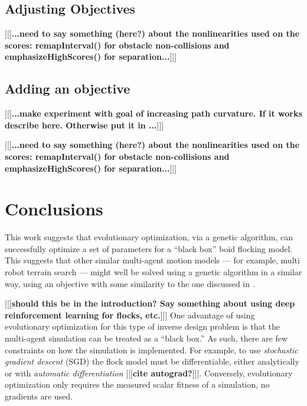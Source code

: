 \documentclass[letterpaper]{article}
\begin{document}
\subsection{Adjusting Objectives}
\label{subsec:adjust_objective}

[[[\textbf{...need to say something (here?) about the nonlinearities used on the scores: remapInterval() for obstacle non-collisions and emphasizeHighScores() for separation...}]]]

\subsection{Adding an objective}
\label{subsec:add_objective}

[[[\textbf{...make experiment with goal of increasing path curvature. If it works describe here. Otherwise put it in ...}]]]

[[[\textbf{...need to say something (here?) about the nonlinearities used on the scores: remapInterval() for obstacle non-collisions and emphasizeHighScores() for separation...}]]]

\section{Conclusions}
\label{sec:Conclusions}

This work suggests that evolutionary optimization, via a genetic algorithm, can successfully optimize a set of parameters for a ``black box'' boid flocking model. This suggests that other similar multi-agent motion models --- for example, multi robot terrain search --- might well be solved using a genetic algorithm in a similar way, using an objective with some similarity to the one discussed in .

[[[\textbf{should this be in the introduction? Say something about using deep reinforcement learning for flocks, etc.}]]] One advantage of using evolutionary optimization for this type of inverse design problem is that the multi-agent simulation can be treated as a ``black box.'' As such, there are few constraints on how the simulation is implemented. For example, to use \textit{stochastic gradient descent} (SGD) \citep{robbins_stochastic_1951} the flock model must be differentiable, either analytically or with \textit{automatic differentiation} [[[\textbf{cite autograd?}]]]. Conversely, evolutionary optimization only requires the measured scalar fitness of a simulation, no gradients are used.
\end{document}
